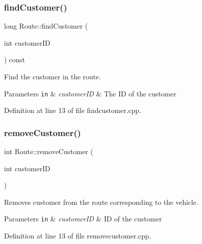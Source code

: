 \mbox{\label{class_route_ae8402085cd8be017e3ac15fd8b3a05fd}} 
\subsubsection{\texorpdfstring{find\+Customer()}{findCustomer()}}
{\footnotesize\ttfamily long Route\+::find\+Customer (\begin{DoxyParamCaption}\item[{int}]{customer\+ID }\end{DoxyParamCaption}) const}



Find the customer in the route. 


\begin{DoxyParams}[1]{Parameters}
\mbox{\tt in}  & {\em customer\+ID} & The ID of the customer \\
\hline
\end{DoxyParams}


Definition at line 13 of file findcustomer.\+cpp.

\mbox{\label{class_route_a3e52680923dc08fe57d7a622cf8ad17b}} 
\subsubsection{\texorpdfstring{remove\+Customer()}{removeCustomer()}}
{\footnotesize\ttfamily int Route\+::remove\+Customer (\begin{DoxyParamCaption}\item[{int}]{customer\+ID }\end{DoxyParamCaption})}



Removes customer from the route corresponding to the vehicle. 


\begin{DoxyParams}[1]{Parameters}
\mbox{\tt in}  & {\em customer\+ID} & ID of the customer \\
\hline
\end{DoxyParams}


Definition at line 13 of file removecustomer.\+cpp.

\mbox{\label{class_route_a463c649701eb3ed5c659f5e920460335}} 
